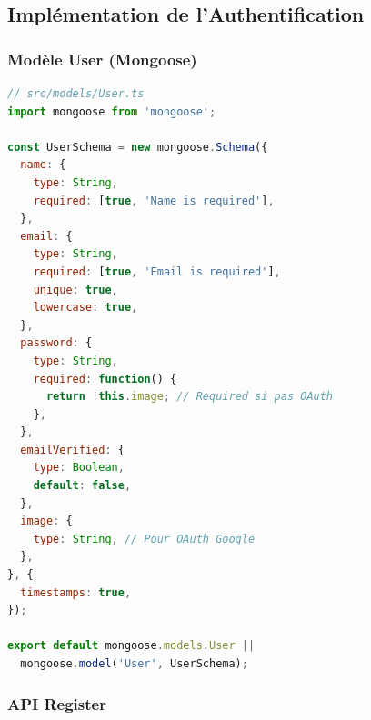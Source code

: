 \subsection{Implémentation de l'Authentification}

\subsubsection{Modèle User (Mongoose)}

\begin{lstlisting}[language=JavaScript, caption=Schéma Mongoose User, label=code:user-schema]
// src/models/User.ts
import mongoose from 'mongoose';

const UserSchema = new mongoose.Schema({
  name: {
    type: String,
    required: [true, 'Name is required'],
  },
  email: {
    type: String,
    required: [true, 'Email is required'],
    unique: true,
    lowercase: true,
  },
  password: {
    type: String,
    required: function() {
      return !this.image; // Required si pas OAuth
    },
  },
  emailVerified: {
    type: Boolean,
    default: false,
  },
  image: {
    type: String, // Pour OAuth Google
  },
}, {
  timestamps: true,
});

export default mongoose.models.User || 
  mongoose.model('User', UserSchema);
\end{lstlisting}

\subsubsection{API Register}

